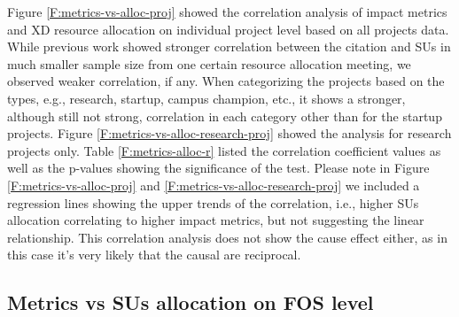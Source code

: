 Figure \ref{F:metrics-vs-alloc-proj} showed the correlation analysis of impact metrics and XD resource allocation on individual project level based on all projects data. While previous work showed stronger correlation between the citation and SUs \cite{bollen2011and} in much smaller sample size from one certain resource allocation meeting, we observed weaker correlation, if any. When categorizing the projects based on the types, e.g., research, startup, campus champion, etc., it shows a stronger, although still not strong, correlation in each category other than for the startup projects. Figure \ref{F:metrics-vs-alloc-research-proj} showed the analysis for research projects only. Table \ref{F:metrics-alloc-r} listed the correlation coefficient values as well as the p-values showing the significance of the test. Please note in Figure \ref{F:metrics-vs-alloc-proj} and \ref{F:metrics-vs-alloc-research-proj} we included a regression lines showing the upper trends of the correlation, i.e., higher SUs allocation correlating to higher impact metrics, but not suggesting the linear relationship. This correlation analysis does not show the cause effect either, as in this case it's very likely that the causal are reciprocal.

\subsection{Metrics vs SUs allocation on FOS level}

